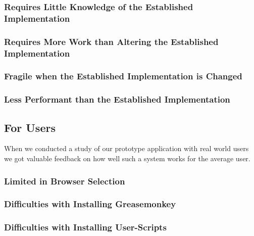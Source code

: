 \subsubsection{Requires Little Knowledge of the Established Implementation}

\subsubsection{Requires More Work than Altering the Established Implementation}

\subsubsection{Fragile when the Established Implementation is Changed}

\subsubsection{Less Performant than the Established Implementation}

\subsection{For Users}

When we conducted a study of our prototype application with real world users
we got valuable feedback on how well such a system works for the average user.


\subsubsection{Limited in Browser Selection}

\subsubsection{Difficulties with Installing Greasemonkey}

\subsubsection{Difficulties with Installing User-Scripts}
